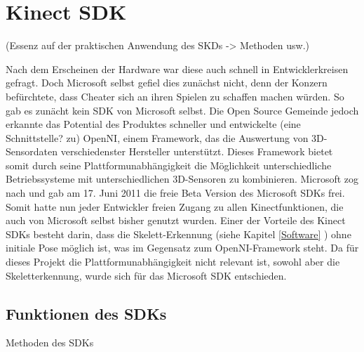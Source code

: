 \section{Kinect SDK}
(Essenz auf der praktischen Anwendung des SKDs -> Methoden usw.)

Nach dem Erscheinen der Hardware war diese auch schnell in Entwicklerkreisen gefragt. Doch Microsoft selbst gefiel dies zunächst nicht, denn der Konzern befürchtete, dass Cheater sich an ihren Spielen zu schaffen machen würden.
So gab es zunächt kein SDK von Microsoft selbst. Die Open Source Gemeinde jedoch erkannte das Potential des Produktes schneller und entwickelte (eine Schnittstelle? zu) OpenNI, einem Framework, das die Auswertung von 3D-Sensordaten verschiedenster Hersteller unterstützt. Dieses Framework bietet somit durch seine Plattformunabhängigkeit die Möglichkeit unterschiedliche Betriebssysteme mit unterschiedlichen 3D-Sensoren zu kombinieren.\cite{webb2012beginning}
Microsoft zog nach und gab am 17. Juni 2011 die freie Beta Version des Microsoft SDKs frei. Somit hatte nun jeder Entwickler freien Zugang zu allen Kinectfunktionen, die auch von Microsoft selbst bisher genutzt wurden. Einer der Vorteile des Kinect SDKs besteht darin, dass die Skelett-Erkennung (siehe Kapitel \ref{Software} ) ohne initiale Pose möglich ist, was im Gegensatz zum OpenNI-Framework steht. \cite{webb2012beginning} Da für dieses Projekt die Plattformunabhängigkeit nicht relevant ist, sowohl aber die Skeletterkennung, wurde sich für das Microsoft SDK entschieden.

\subsection{Funktionen des SDKs}
Methoden des SDKs




